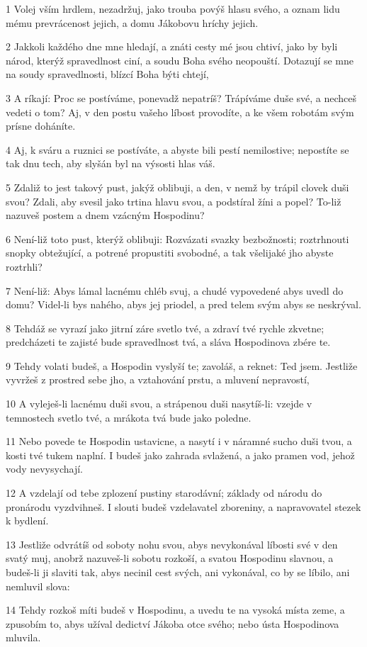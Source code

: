 \par 1 Volej vším hrdlem, nezadržuj, jako trouba povýš hlasu svého, a oznam lidu mému prevrácenost jejich, a domu Jákobovu hríchy jejich.
\par 2 Jakkoli každého dne mne hledají, a znáti cesty mé jsou chtiví, jako by byli národ, kterýž spravedlnost ciní, a soudu Boha svého neopouští. Dotazují se mne na soudy spravedlnosti, blízcí Boha býti chtejí,
\par 3 A ríkají: Proc se postíváme, ponevadž nepatríš? Trápíváme duše své, a nechceš vedeti o tom? Aj, v den postu vašeho líbost provodíte, a ke všem robotám svým prísne doháníte.
\par 4 Aj, k sváru a ruznici se postíváte, a abyste bili pestí nemilostive; nepostíte se tak dnu tech, aby slyšán byl na výsosti hlas váš.
\par 5 Zdaliž to jest takový pust, jakýž oblibuji, a den, v nemž by trápil clovek duši svou? Zdali, aby svesil jako trtina hlavu svou, a podstíral žíni a popel? To-liž nazuveš postem a dnem vzácným Hospodinu?
\par 6 Není-liž toto pust, kterýž oblibuji: Rozvázati svazky bezbožnosti; roztrhnouti snopky obtežující, a potrené propustiti svobodné, a tak všelijaké jho abyste roztrhli?
\par 7 Není-liž: Abys lámal lacnému chléb svuj, a chudé vypovedené abys uvedl do domu? Videl-li bys nahého, abys jej priodel, a pred telem svým abys se neskrýval.
\par 8 Tehdáž se vyrazí jako jitrní záre svetlo tvé, a zdraví tvé rychle zkvetne; predcházeti te zajisté bude spravedlnost tvá, a sláva Hospodinova zbére te.
\par 9 Tehdy volati budeš, a Hospodin vyslyší te; zavoláš, a reknet: Ted jsem. Jestliže vyvržeš z prostred sebe jho, a vztahování prstu, a mluvení nepravostí,
\par 10 A vyleješ-li lacnému duši svou, a strápenou duši nasytíš-li: vzejde v temnostech svetlo tvé, a mrákota tvá bude jako poledne.
\par 11 Nebo povede te Hospodin ustavicne, a nasytí i v náramné sucho duši tvou, a kosti tvé tukem naplní. I budeš jako zahrada svlažená, a jako pramen vod, jehož vody nevysychají.
\par 12 A vzdelají od tebe zplození pustiny starodávní; základy od národu do pronárodu vyzdvihneš. I slouti budeš vzdelavatel zboreniny, a napravovatel stezek k bydlení.
\par 13 Jestliže odvrátíš od soboty nohu svou, abys nevykonával líbosti své v den svatý muj, anobrž nazuveš-li sobotu rozkoší, a svatou Hospodinu slavnou, a budeš-li ji slaviti tak, abys necinil cest svých, ani vykonával, co by se líbilo, ani nemluvil slova:
\par 14 Tehdy rozkoš míti budeš v Hospodinu, a uvedu te na vysoká místa zeme, a zpusobím to, abys užíval dedictví Jákoba otce svého; nebo ústa Hospodinova mluvila.

